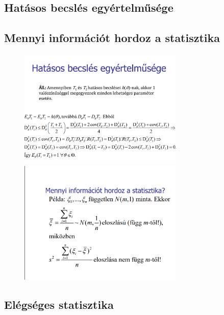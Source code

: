 \documentclass[12pt]{article}
\begin{document}
    \newpage
    \subsection{Hatásos becslés egyértelműsége}
    \subsection{Mennyi információt hordoz a statisztika}

    \begin{figure}[h]
        \centering
        \includegraphics[width=0.7\textwidth]{hatasos_becsles_egyert.png}
        \includegraphics[width=0.7\textwidth]{2.png}
    \end{figure}

    \newpage
    \subsection{Elégséges statisztika}
\end{document}
